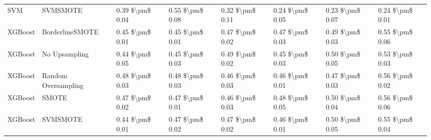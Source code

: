 \begin{tabular}{llllllll}
                            SVM &                      SVMSMOTE & 0.39 \$\textbackslash pm\$ 0.04 &           0.55 \$\textbackslash pm\$ 0.08 &       0.32 \$\textbackslash pm\$ 0.11 &        0.24 \$\textbackslash pm\$ 0.05 &                         0.23 \$\textbackslash pm\$ 0.07 &     0.24 \$\textbackslash pm\$ 0.01 \\
                        XGBoost &               BorderlineSMOTE & 0.45 \$\textbackslash pm\$ 0.01 &           0.45 \$\textbackslash pm\$ 0.01 &       0.47 \$\textbackslash pm\$ 0.02 &        0.47 \$\textbackslash pm\$ 0.03 &                         0.49 \$\textbackslash pm\$ 0.03 &     0.55 \$\textbackslash pm\$ 0.06 \\
                        XGBoost &                 No Upsampling & 0.44 \$\textbackslash pm\$ 0.05 &           0.45 \$\textbackslash pm\$ 0.03 &       0.49 \$\textbackslash pm\$ 0.02 &        0.45 \$\textbackslash pm\$ 0.03 &                         0.50 \$\textbackslash pm\$ 0.05 &     0.53 \$\textbackslash pm\$ 0.03 \\
                        XGBoost &           Random Oversampling & 0.48 \$\textbackslash pm\$ 0.03 &           0.48 \$\textbackslash pm\$ 0.03 &       0.46 \$\textbackslash pm\$ 0.03 &        0.46 \$\textbackslash pm\$ 0.01 &                         0.47 \$\textbackslash pm\$ 0.03 &     0.56 \$\textbackslash pm\$ 0.02 \\
                        XGBoost &                         SMOTE & 0.47 \$\textbackslash pm\$ 0.02 &           0.47 \$\textbackslash pm\$ 0.01 &       0.46 \$\textbackslash pm\$ 0.03 &        0.48 \$\textbackslash pm\$ 0.05 &                         0.50 \$\textbackslash pm\$ 0.04 &     0.56 \$\textbackslash pm\$ 0.06 \\
                        XGBoost &                      SVMSMOTE & 0.44 \$\textbackslash pm\$ 0.01 &           0.47 \$\textbackslash pm\$ 0.02 &       0.47 \$\textbackslash pm\$ 0.02 &        0.46 \$\textbackslash pm\$ 0.01 &                         0.50 \$\textbackslash pm\$ 0.05 &     0.55 \$\textbackslash pm\$ 0.04 \\
\bottomrule
\end{tabular}
